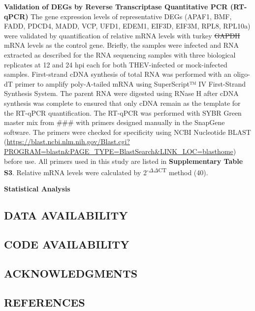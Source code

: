 \documentclass[
]{article}
\begin{document}
\textbf{Validation of DEGs by Reverse Transcriptase Quantitative PCR
(RT-qPCR)} The gene expression levels of representative DEGs (APAF1,
BMF, FADD, PDCD4, MADD, VCP, UFD1, EDEM1, EIF3D, EIF3M, RPL8, RPL10a)
were validated by quantification of relative mRNA levels with turkey
\st{GAPDH} mRNA levels as the control gene. Briefly, the samples were
infected and RNA extracted as described for the RNA sequencing samples
with three biological replicates at 12 and 24 hpi each for both
THEV-infected or mock-infected samples. First-strand cDNA synthesis of
total RNA was performed with an oligo-dT primer to amplify poly-A-tailed
mRNA using SuperScript™ IV First-Strand Synthesis System. The parent RNA
were digested using RNase H after cDNA synthesis was complete to ensured
that only cDNA remain as the template for the RT-qPCR quantification.
The RT-qPCR was performed with SYBR Green master mix from \#\#\# with
primers designed manually in the SnapGene software. The primers were
checked for specificity using NCBI Nucleotide BLAST
(\url{https://blast.ncbi.nlm.nih.gov/Blast.cgi?PROGRAM=blastn&PAGE_TYPE=BlastSearch&LINK_LOC=blasthome})
before use. All primers used in this study are listed in
\textbf{Supplementary Table S3}. Relative mRNA levels were calculated by
2\textsuperscript{-\(\Delta\)\(\Delta\)CT} method (40).

\textbf{Statistical Analysis} \newpage

\subsection{DATA AVAILABILITY}\label{data-availability}

\newpage

\subsection{CODE AVAILABILITY}\label{code-availability}

\newpage

\subsection{ACKNOWLEDGMENTS}\label{acknowledgments}

\newpage

\subsection{REFERENCES}\label{references}
\end{document}
